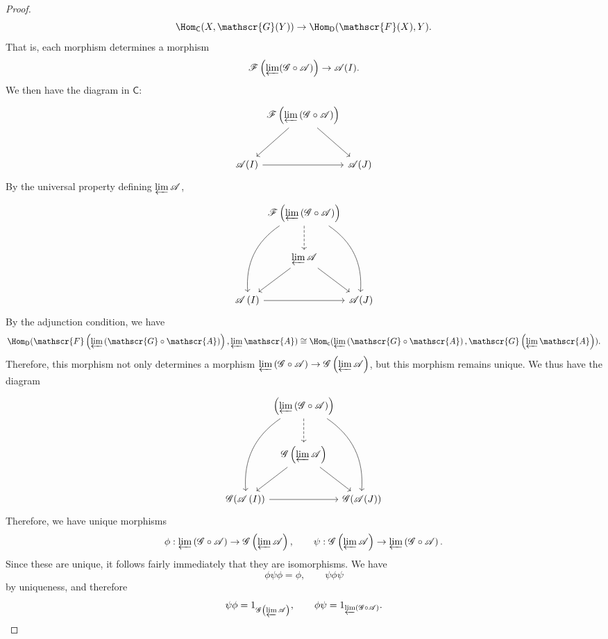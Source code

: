 \begin{proof}
\[
	\Hom_{\mathsf{C} }(X, \mathscr{G} (Y)) \to \Hom_{\mathsf{D} }(\mathscr{F} (X), Y) 
.\]
That is, each morphism determines a morphism
\[
	\mathscr{F} \left( \varprojlim (\mathscr{G} \circ \mathscr{A} ) \right) \to \mathscr{A} (I)
.\]
We then have the diagram in $\mathsf{C} $:
\[\begin{tikzcd}[row sep = 3em, column sep = 0em]
	&\mathscr{F} \left( \varprojlim \left( \mathscr{G} \circ \mathscr{A}  \right)  \right) \arrow[dr]\arrow[dl]\\
	\mathscr{A} (I)\arrow[rr]&&\mathscr{A} (J)
\end{tikzcd}\]
By the universal property defining $\varprojlim \mathscr{A} $,
\[\begin{tikzcd}[row sep = 2.5em, column sep = 0em]
	&\mathscr{F} \left( \varprojlim \left( \mathscr{G} \circ \mathscr{A}  \right)  \right) \arrow[ddl, bend right]\arrow[ddr, bend left]\arrow[d, dashed]\\
	&\varprojlim \mathscr{A} \arrow[dl]\arrow[dr]\\
	\mathscr{A} \left( I \right)\arrow[rr] &&\mathscr{A} (J)
\end{tikzcd}\]
By the adjunction condition, we have
\[
	\Hom_{\mathsf{D} }(\mathscr{F} \left( \varprojlim \left( \mathscr{G} \circ \mathscr{A}  \right)  \right) , \varprojlim \mathscr{A} ) \cong \Hom_{\mathsf{c} }(\varprojlim \left( \mathscr{G} \circ \mathscr{A}  \right) , \mathscr{G} \left( \varprojlim \mathscr{A}  \right) ) 
.\]
Therefore, this morphism not only determines a morphism $\varprojlim \left( \mathscr{G} \circ \mathscr{A}  \right) \to \mathscr{G} \left( \varprojlim \mathscr{A}  \right) $, but this morphism remains unique. We thus have the diagram
\[\begin{tikzcd}[row sep = 2.5em, column sep = 0em]
	&\left( \varprojlim \left( \mathscr{G} \circ \mathscr{A}  \right)  \right) \arrow[ddl, bend right]\arrow[ddr, bend left]\arrow[d, dashed]\\
	&\mathscr{G} \left(\varprojlim \mathscr{A} \right)\arrow[dl]\arrow[dr]\\
	\mathscr{G} (\mathscr{A} \left( I \right))\arrow[rr] &&\mathscr{G} (\mathscr{A} (J))
\end{tikzcd}\]
Therefore, we have unique morphisms
\[
	\phi :\varprojlim \left( \mathscr{G} \circ \mathscr{A}  \right) \to \mathscr{G} \left( \varprojlim \mathscr{A}  \right) ,\qquad \psi :\mathscr{G} \left( \varprojlim \mathscr{A}  \right) \to \varprojlim \left( \mathscr{G} \circ \mathscr{A}  \right) 
.\]
Since these are unique, it follows fairly immediately that they are isomorphisms. We have
\[
	\phi \psi \phi =\phi ,\qquad \psi \phi \psi 
\]
by uniqueness, and therefore
\[
	\psi \phi =1_{\mathscr{G} \left( \varprojlim \mathscr{A}  \right) } ,\qquad \phi \psi =1_{\varprojlim \left( \mathscr{G} \circ \mathscr{A}  \right) } 
.\]
\end{proof}

